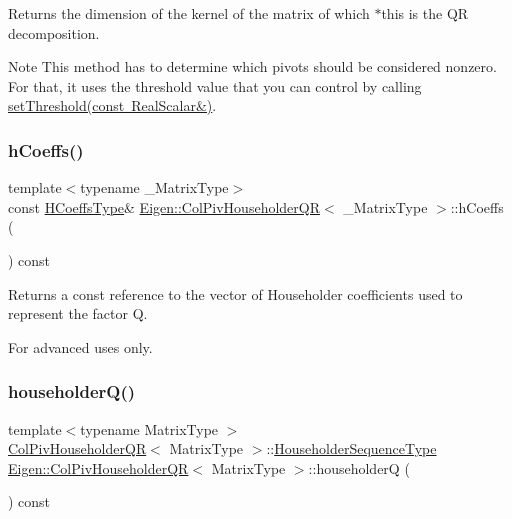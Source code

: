 \begin{DoxyReturn}{Returns}
the dimension of the kernel of the matrix of which $\ast$this is the QR decomposition.
\end{DoxyReturn}
\begin{DoxyNote}{Note}
This method has to determine which pivots should be considered nonzero. For that, it uses the threshold value that you can control by calling \mbox{\hyperlink{class_eigen_1_1_col_piv_householder_q_r_ae712cdc9f0e521cfc8061bee58ff55ee}{set\+Threshold(const Real\+Scalar\&)}}. 
\end{DoxyNote}
\mbox{\label{class_eigen_1_1_col_piv_householder_q_r_ac5943d19aa5fd96340c7df6874fcb1b9}} 
\subsubsection{\texorpdfstring{hCoeffs()}{hCoeffs()}}
{\footnotesize\ttfamily template$<$typename \+\_\+\+Matrix\+Type$>$ \\
const \mbox{\hyperlink{struct_eigen_1_1internal_1_1true__type}{H\+Coeffs\+Type}}\& \mbox{\hyperlink{class_eigen_1_1_col_piv_householder_q_r}{Eigen\+::\+Col\+Piv\+Householder\+QR}}$<$ \+\_\+\+Matrix\+Type $>$\+::h\+Coeffs (\begin{DoxyParamCaption}{ }\end{DoxyParamCaption}) const\hspace{0.3cm}{\ttfamily [inline]}}

\begin{DoxyReturn}{Returns}
a const reference to the vector of Householder coefficients used to represent the factor {\ttfamily Q}.
\end{DoxyReturn}
For advanced uses only. \mbox{\label{class_eigen_1_1_col_piv_householder_q_r_a28ab9d8916ca609c5469c4c192fbfa28}} 
\subsubsection{\texorpdfstring{householderQ()}{householderQ()}}
{\footnotesize\ttfamily template$<$typename Matrix\+Type $>$ \\
\mbox{\hyperlink{class_eigen_1_1_col_piv_householder_q_r}{Col\+Piv\+Householder\+QR}}$<$ Matrix\+Type $>$\+::\mbox{\hyperlink{class_eigen_1_1_householder_sequence}{Householder\+Sequence\+Type}} \mbox{\hyperlink{class_eigen_1_1_col_piv_householder_q_r}{Eigen\+::\+Col\+Piv\+Householder\+QR}}$<$ Matrix\+Type $>$\+::householderQ (\begin{DoxyParamCaption}{ }\end{DoxyParamCaption}) const}

